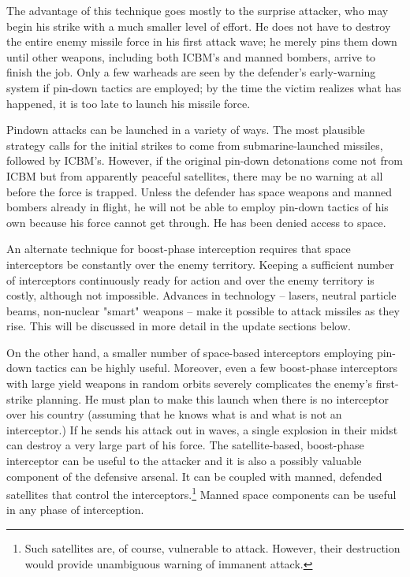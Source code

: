 The advantage of this technique goes mostly to the surprise attacker, who may begin his strike with a much smaller level of effort. He does not have to destroy the entire enemy missile force in his first attack wave; he merely pins them down until other weapons, including both ICBM's and manned bombers, arrive to finish the job. Only a few warheads are seen by the defender's early-warning system if pin-down tactics are employed; by the time the victim realizes what has happened, it is too late to launch his missile force.

Pindown attacks can be launched in a variety of ways. The most plausible strategy calls for the initial strikes to come from submarine-launched missiles, followed by ICBM's. However, if the original pin-down detonations come not from ICBM but from apparently peaceful satellites, there may be no warning at all before the force is trapped. Unless the defender has space weapons and manned bombers already in flight, he will not be able to employ pin-down tactics of his own because his force cannot get through. He has been denied access to space.

An alternate technique for boost-phase interception requires that space interceptors be constantly over the enemy territory. Keeping a sufficient number of interceptors continuously ready for action and over the enemy territory is costly, although not impossible. Advances in technology -- lasers, neutral particle beams, non-nuclear "smart" weapons -- make it possible to attack missiles as they rise. This will be discussed in more detail in the update sections below.

On the other hand, a smaller number of space-based interceptors employing pin-down tactics can be highly useful. Moreover, even a few boost-phase interceptors with large yield weapons in random orbits severely complicates the enemy's first-strike planning. He must plan to make this launch when there is no interceptor over his country (assuming that he knows what is and what is not an interceptor.) If he sends his attack out in waves, a single explosion in their midst can destroy a very large part of his force. The satellite-based, boost-phase interceptor can be useful to the attacker and it is also a possibly valuable component of the defensive arsenal. It can be coupled with manned, defended satellites that control the interceptors.\footnote{
Such satellites are, of course, vulnerable to attack. However, their destruction would provide unambiguous warning of immanent attack.} Manned space components can be useful in any phase of interception.

